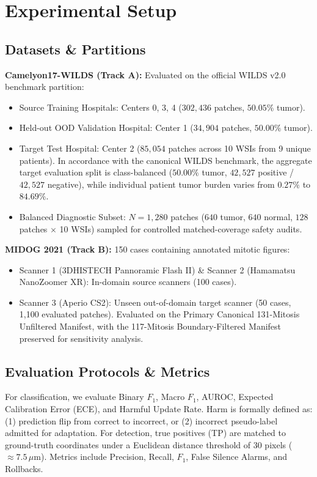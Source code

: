 \documentclass[conference]{IEEEtran}
\begin{document}
\section{Experimental Setup}

\subsection{Datasets \& Partitions}
\textbf{Camelyon17-WILDS (Track A):} Evaluated on the official WILDS v2.0 benchmark partition:
\begin{itemize}
    \item Source Training Hospitals: Centers 0, 3, 4 ($302{,}436$ patches, $50.05\%$ tumor).
    \item Held-out OOD Validation Hospital: Center 1 ($34{,}904$ patches, $50.00\%$ tumor).
    \item Target Test Hospital: Center 2 ($85{,}054$ patches across 10 WSIs from 9 unique patients). In accordance with the canonical WILDS benchmark, the aggregate target evaluation split is class-balanced ($50.00\%$ tumor, $42{,}527$ positive / $42{,}527$ negative), while individual patient tumor burden varies from $0.27\%$ to $84.69\%$.
    \item Balanced Diagnostic Subset: $N=1{,}280$ patches ($640$ tumor, $640$ normal, $128$ patches $\times$ 10 WSIs) sampled for controlled matched-coverage safety audits.
\end{itemize}

\textbf{MIDOG 2021 (Track B):} 150 cases containing annotated mitotic figures:
\begin{itemize}
    \item Scanner 1 (3DHISTECH Pannoramic Flash II) \& Scanner 2 (Hamamatsu NanoZoomer XR): In-domain source scanners (100 cases).
    \item Scanner 3 (Aperio CS2): Unseen out-of-domain target scanner (50 cases, 1,100 evaluated patches). Evaluated on the Primary Canonical 131-Mitosis Unfiltered Manifest, with the 117-Mitosis Boundary-Filtered Manifest preserved for sensitivity analysis.
\end{itemize}

\subsection{Evaluation Protocols \& Metrics}
For classification, we evaluate Binary $F_1$, Macro $F_1$, AUROC, Expected Calibration Error (ECE), and Harmful Update Rate. Harm is formally defined as: (1) prediction flip from correct to incorrect, or (2) incorrect pseudo-label admitted for adaptation.
For detection, true positives (TP) are matched to ground-truth coordinates under a Euclidean distance threshold of 30 pixels ($\approx 7.5\,\mu\text{m}$). Metrics include Precision, Recall, $F_1$, False Silence Alarms, and Rollbacks.
\end{document}
